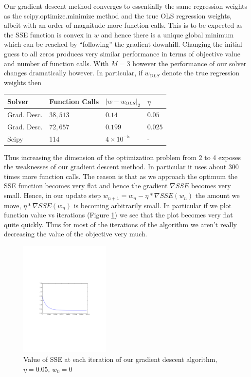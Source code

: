 \documentclass[10pt]{article}
\begin{document}
Our gradient descent method converges to essentially the same regression weights as the scipy.optimize.minimize method and the true OLS regression weights, albeit with an order of magnitude more function calls. This is to be expected as the SSE function is convex in $w$ and hence there is a unique global minimum which can be reached by ``following'' the gradient downhill. Changing the initial guess to all zeros produces very similar performance in terms of objective value and number of function calls. With $M=3$ however the performance of our solver changes dramatically however. In particular, if $w_{OLS}$ denote the true regression weights then

\begin{tabular}{|l|l|l|l|}
\hline
Solver & Function Calls & $|w - w_{OLS}|_2$ & $\eta$ \\ \hline
Grad. Desc. & $38,513$ & $0.14$ & $0.05$ \\ \hline
Grad. Desc. & $72, 657$ & $0.199$ & $0.025$ \\ \hline
Scipy & 114 & $4\times 10^{-5}$ & - \\ \hline
\end{tabular}
%
%

Thus increasing the dimension of the optimization problem from 2 to 4 exposes the weaknesses of our gradient descent method. In particular it uses about $300$ times more function calls. The reason is that as we approach the optimum the SSE function becomes very flat and hence the gradient $\nabla SSE$ becomes very small. Hence, in our update step $w_{n+1} = w_n - \eta*\nabla SSE(w_n)$ the amount we move, $\eta*\nabla SSE(w_n)$ is becoming arbitrarily small. In particular if we plot function value vs iterations (Figure \ref{grad-descent-iterations}) we see that the plot becomes very flat quite quickly. Thus for most of the iterations of the algorithm we aren't really decreasing the value of the objective very much. 

\begin{figure}[h]
\centering
\includegraphics[width=0.4\textwidth]{lin-reg-fig-1}
\caption{Value of SSE at each iteration of our gradient descent algorithm, $\eta = 0.05$, $w_0 = 0$}
\label{grad-descent-iterations}
\end{figure}
\end{document}
